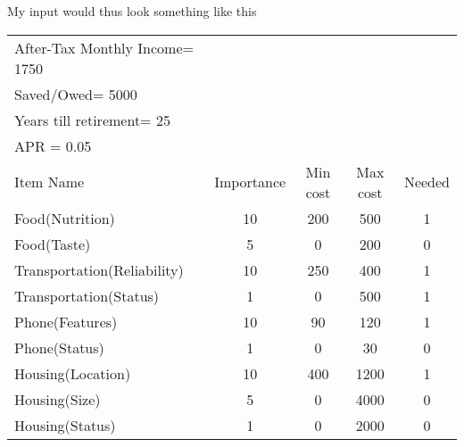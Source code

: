 \documentclass[11pt]{article}
\begin{document}
My input would thus look something like this
\begin{center}
\begin{tabular}{lcccc}
  After-Tax Monthly Income= 1750 &&&&\\
  Saved/Owed= 5000 &&&&\\
  Years till retirement= 25 &&&&\\
  APR = 0.05 &&&&\\
  Item Name & Importance & Min cost & Max cost & Needed\\
  Food(Nutrition) & 10 & 200 & 500 & 1 \\
  Food(Taste) & 5 & 0 & 200 & 0 \\
  Transportation(Reliability) & 10 & 250 & 400 & 1 \\
  Transportation(Status) & 1 & 0 & 500 & 1 \\
  Phone(Features) & 10 & 90 & 120 & 1 \\
  Phone(Status) & 1 & 0 & 30 & 0 \\
  Housing(Location) & 10 & 400 & 1200 & 1 \\
  Housing(Size) & 5 & 0 & 4000 & 0 \\
  Housing(Status) & 1 & 0 & 2000 & 0 \\
\end{tabular}
\end{center}
\end{document}
